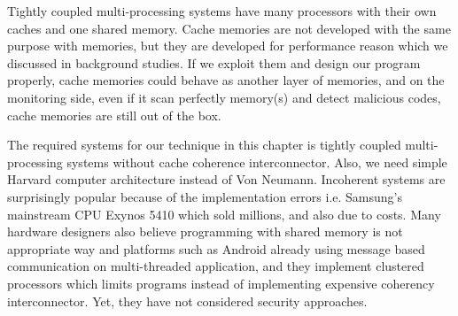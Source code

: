 Tightly coupled multi-processing systems have many processors with their own caches and one shared memory\cite{Jim2007}. Cache memories are not developed with the same purpose with memories, but they are developed for performance reason which we discussed in background studies. If we exploit them and design our program properly, cache memories could behave as another layer of memories, and on the monitoring side, even if it scan perfectly memory(s) and detect malicious codes, cache memories are still out of the box.

The required systems for our technique in this chapter is tightly coupled multi-processing systems without cache coherence interconnector. Also, we need simple Harvard computer architecture instead of Von Neumann. Incoherent systems are surprisingly popular because of the implementation errors i.e. Samsung's mainstream CPU Exynos 5410 which sold millions, and also due to costs. Many hardware designers also believe programming with shared memory is not appropriate way and platforms such as Android already using message based communication on multi-threaded application, and  they implement clustered processors which limits programs instead of implementing expensive coherency interconnector. Yet, they have not considered security approaches.

	

